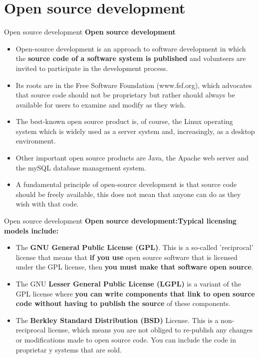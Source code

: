 \documentclass{beamer}
\begin{document}
\section{Open source development}
\begin{frame}{Open source development}
\textbf{Open source development}
\begin{itemize}
	\item  Open-source development is an approach to software development 
	in which the \textbf{source code of a software system is published }and 
	volunteers are invited to participate in the development process.

	\item Its roots are in the Free Software Foundation 
	(www.fsf.org), which advocates that source code should 
	not be proprietary but rather should always be available 
	for users to examine and modify as they wish. 

	\item The best-known open source product is, of course, the 
	Linux operating system which is widely used as a server 
	system and, increasingly, as a desktop environment.
	\item Other important open source products are Java, the 
	Apache web server and the mySQL database 
	management system. 
	\item A fundamental principle of open-source development is 
	that source code should be freely available, this does not 
	mean that anyone can do as they wish with that code.
\end{itemize}
\end{frame}
\begin{frame}{Open source development}
	\textbf{Open source development:Typical licensing models include:}
	\begin{itemize}
		\item  The \textbf{GNU General Public License (GPL)}. This is a so-called 'reciprocal' license that means that \textbf{if you use }open source software that is licensed under the GPL license, then \textbf{you must make that software open source}.
		\item The GNU\textbf{ Lesser General Public License (LGPL)} is a variant of the GPL license where \textbf{you can write components that link to open source code without having to publish the source }of these components.
		\item The\textbf{ Berkley Standard Distribution (BSD)} License. This is a non-reciprocal license, which means you are not obliged to re-publish any changes or modifications made to open source code. You can include the code in proprietar
		y systems that are sold.
	\end{itemize}
\end{frame}
\end{document}
